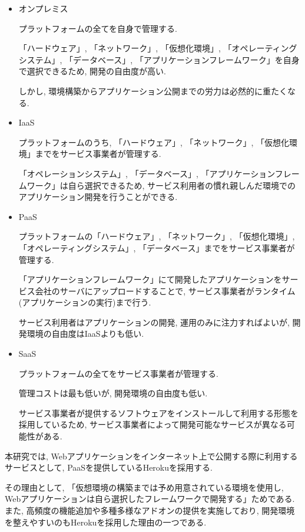 \begin{itemize}
\item オンプレミス

プラットフォームの全てを自身で管理する.

「ハードウェア」, 「ネットワーク」, 「仮想化環境」, 「オペレーティングシステム」, 「データベース」, 「アプリケーションフレームワーク」を自身で選択できるため, 開発の自由度が高い.

しかし, 環境構築からアプリケーション公開までの労力は必然的に重たくなる.

\item IaaS

プラットフォームのうち, 「ハードウェア」, 「ネットワーク」, 「仮想化環境」までをサービス事業者が管理する.

「オペレーションシステム」, 「データベース」, 「アプリケーションフレームワーク」は自ら選択できるため, サービス利用者の慣れ親しんだ環境でのアプリケーション開発を行うことができる.

\item PaaS

プラットフォームの「ハードウェア」, 「ネットワーク」, 「仮想化環境」, 「オペレーティングシステム」, 「データベース」までをサービス事業者が管理する.

「アプリケーションフレームワーク」にて開発したアプリケーションをサービス会社のサーバにアップロードすることで, サービス事業者がランタイム(アプリケーションの実行)まで行う.

サービス利用者はアプリケーションの開発, 運用のみに注力すればよいが, 開発環境の自由度はIaaSよりも低い.

\item SaaS

プラットフォームの全てをサービス事業者が管理する.

管理コストは最も低いが, 開発環境の自由度も低い.

サービス事業者が提供するソフトウェアをインストールして利用する形態を採用しているため, サービス事業者によって開発可能なサービスが異なる可能性がある.
\end{itemize}

本研究では, Webアプリケーションをインターネット上で公開する際に利用するサービスとして, PaaSを提供しているHerokuを採用する.

その理由として,  「仮想環境の構築までは予め用意されている環境を使用し, Webアプリケーションは自ら選択したフレームワークで開発する」ためである.
また, 高頻度の機能追加や多種多様なアドオンの提供を実施しており, 開発環境を整えやすいのもHerokuを採用した理由の一つである.
